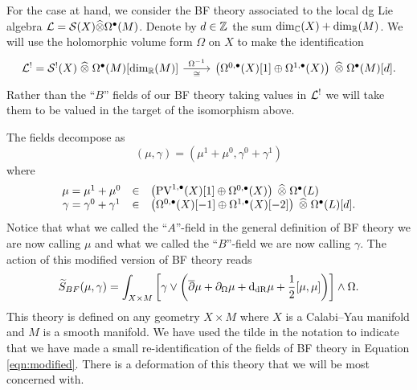 \documentclass[11pt]{amsart}
\def\PV{{\rm PV}}
\begin{document}
For the case at hand, we consider the BF theory associated to the local dg Lie algebra $\mathcal L = \mathcal S(X) \widehat{\otimes} \Omega^\bullet(M)$.
Denote by $d \in \mathbb Z$ the sum $\dim_{\mathbb C}(X) + \dim_{\mathbb R}(M)$.
We will use the holomorphic volume form $\Omega$ on $X$ to make the identification
\begin{equation}\label{eqn:modified}
\begin{tikzcd}
\cL^! = \cS^! (X) \; \Hat{\otimes} \; \Omega^\bu (M) [\dim_{\RR}(M)] \ar[r, "\Omega^{-1}", "\cong"'] & \left(\Omega^{0,\bu}(X)[1] \oplus \Omega^{1,\bu}(X)\right) \; \Hat{\otimes} \; \Omega^{\bu}(M)[d] .
\end{tikzcd}
\end{equation}
Rather than the ``$B$'' fields of our BF theory taking values in $\mathcal L^!$ we will take them to be valued in the target of the isomorphism above.

The fields decompose as
\[
(\mu, \gamma) = (\mu^1 + \mu^0, \gamma^0 + \gamma^1)
\]
where
\[
  \begin{array}{ccl}
    \mu = \mu^1+\mu^0 & \in & \left(\PV^{1,\bu}(X) [1] \oplus \Omega^{0,\bu}(X) \right) \; \Hat{\otimes} \; \Omega^{\bu}(L) \\
    \gamma = \gamma^0 + \gamma^1 & \in & \left(\Omega^{0,\bu}(X)[-1] \oplus \Omega^{1,\bu}(X)[-2] \right) \; \Hat{\otimes}\; \Omega^{\bu}(L)[d] .
  \end{array}
\]
Notice that what we called the ``$A$''-field in the general definition of BF theory we are now calling $\mu$ and what we called the ``$B$''-field we are now calling $\gamma$.
The action of this modified version of BF theory reads 
\[
\widetilde{S}_{BF} (\mu,\gamma) = \int_{X \times M} \left[\gamma \vee \left(\overline{\partial} \mu + \partial_\Omega \mu + {\rm d}_{{\rm dR}} \mu + \frac12 [\mu, \mu] \right) \right] \wedge \Omega .
\]
This theory is defined on any geometry $X \times M$ where $X$ is a Calabi--Yau manifold and $M$ is a smooth manifold.
We have used the tilde in the notation to indicate that we have made a small re-identification of the fields of BF theory in Equation \eqref{eqn:modified}. 
There is a deformation of this theory that we will be most concerned with.


\end{document}

